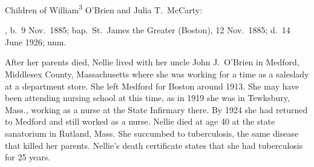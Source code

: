 \begin{KidsIntro}
	Children of William\textsuperscript{3} O'Brien and Julia T.\ McCarty:
\end{KidsIntro}

\begin{Kids}
	, b.\ 9 Nov.\ 1885;\cite{Ellen4OBrienBirth} bap.\ St.\ James the Greater (Boston), 12 Nov.\ 1885;\cite{Ellen4OBrienBaptism} d.\ 14 June 1926;\cite{Ellen4OBrienDeath} unm.
	
	\begin{KidsMoreText}
		After her parents died, Nellie lived with her uncle John J.\ O'Brien in Medford, Middlesex County, Massachusetts\cite{Census1900EllenOBrien} where she was working for a time as a saleslady at a department store.\cite{Census1910EllenOBrien} She left Medford for Boston around 1913.\cite{Ellen4OBrien1914} She may have been attending nursing school at this time, as in 1919 she was in Tewksbury, Mass., working as a nurse at the State Infirmary there.\cite{Ellen4OBrien1919,Census1920EllenOBrien} By 1924 she had returned to Medford and still worked as a nurse.\cite{Ellen4OBrien1924} Nellie died at age 40 at the state sanatorium in Rutland, Mass.\cite{Ellen4OBrienDeath,RutlandHospital} She succumbed to tuberculosis,\cite{Ellen4OBrienDeath2} the same disease that killed her parents. Nellie's death certificate states that she had tuberculosis for 25 years.\cite{Ellen4OBrienDeath2}
	\end{KidsMoreText}

\end{Kids}